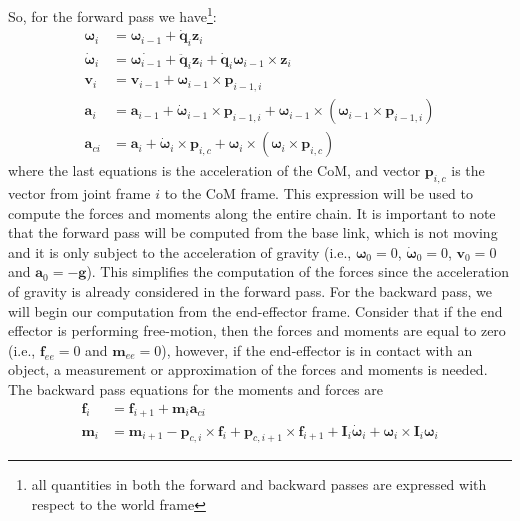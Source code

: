 \documentclass[11pt]{article}
\begin{document}
 So, for the forward pass we have\footnote{all quantities in both the forward and backward passes are expressed with respect to the world frame}:
\begin{align*}
	\boldsymbol{\omega}_i &= \boldsymbol{\omega}_{i-1} + \dot{\mathbf{q}}_i \mathbf{z}_i \\
%	
	\dot{\boldsymbol{\omega}}_i &= \dot{\boldsymbol{\omega}_{i-1}} + \ddot{\mathbf{q}}_i \mathbf{z}_i + \dot{\mathbf{q}}_i \boldsymbol{\omega}_{i-1} \times \mathbf{z}_i \\
%	
	\mathbf{v}_i &= \mathbf{v}_{i-1} + \boldsymbol{\omega}_{i-1} \times \mathbf{p}_{i-1,i} \\
%	
	\mathbf{a}_i &= \mathbf{a}_{i-1} + \dot{\boldsymbol{\omega}}_{i-1} \times \mathbf{p}_{i-1,i} + \boldsymbol{\omega}_{i-1} 	\times (\boldsymbol{\omega}_{i-1} \times \mathbf{p}_{i-1,i}) \\
%	
	\mathbf{a}_{ci} &= \mathbf{a}_{i} + \dot{\boldsymbol{\omega}}_{i} \times \mathbf{p}_{i,c} + \boldsymbol{\omega}_{i} 	\times (\boldsymbol{\omega}_{i} \times \mathbf{p}_{i,c})
\end{align*} 
where the last equations is the acceleration of the CoM, and vector $\mathbf{p}_{i,c}$ is the vector from joint frame $i$ to the CoM frame. This expression will be used to compute the forces and moments along the entire chain. It is important to note that the forward pass will be computed from the base link, which is not moving and it is only subject to the acceleration of gravity (i.e., $\boldsymbol{\omega}_0 = 0$, $\dot{\boldsymbol{\omega}}_0 = 0$, $\mathbf{v}_0 = 0$ and $\mathbf{a}_0 = -\mathbf{g}$). This simplifies the computation of the forces since the acceleration of gravity is already considered in the forward pass. For the backward pass, we will begin our computation from the end-effector frame. Consider that if the end effector is performing free-motion, then the forces and moments are equal to zero (i.e., $\mathbf{f}_{ee} =0$ and $\mathbf{m}_{ee} = 0$), however, if the end-effector is in contact with an object, a measurement or approximation of the forces and moments is needed. The backward pass equations for the moments and forces are
\begin{align*}
	\mathbf{f}_i &= \mathbf{f}_{i+1} + \mathbf{m}_i\mathbf{a}_{ci} \\
	\mathbf{m}_i &= \mathbf{m}_{i+1} - \mathbf{p}_{c,i} \times \mathbf{f}_i + \mathbf{p}_{c,i+1} \times \mathbf{f}_{i+1} + \mathbf{I}_i \dot{\boldsymbol{\omega}}_i + \boldsymbol{\omega}_i  \times \mathbf{I}_i \boldsymbol{\omega}_i
\end{align*}
\end{document}
